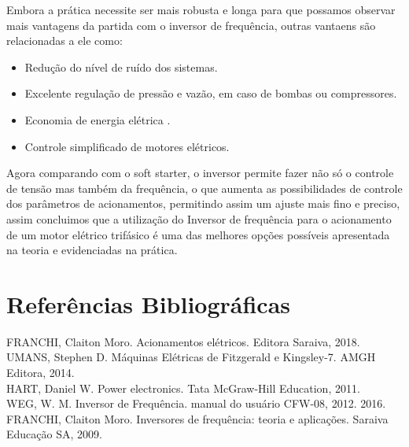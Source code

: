 \documentclass[a4paper, 12pt,oneside, english, brazil]{abntex2}
\begin{document}
Embora a prática necessite ser mais robusta e longa para que possamos observar mais vantagens da partida com o inversor de frequência, outras vantaens são relacionadas a ele como:
\begin{itemize}
    \item Redução do nível de ruído dos sistemas.
    \item Excelente regulação de pressão e vazão, em caso de bombas ou compressores.
    \item Economia de energia elétrica .
    \item Controle simplificado de motores elétricos.
    \end{itemize}
    
Agora comparando com o soft starter, o inversor permite fazer não só o controle de tensão mas também da frequência, o que aumenta as possibilidades de controle dos parâmetros de acionamentos, permitindo assim um ajuste mais fino e preciso, assim concluimos que a utilização do Inversor de frequência para o acionamento de um motor elétrico trifásico é uma das melhores opções possíveis apresentada na teoria e evidenciadas na prática.

\chapter{Referências Bibliográficas}
\footnotesize{

\noindent FRANCHI, Claiton Moro. Acionamentos elétricos. Editora Saraiva, 2018.\\

\noindent UMANS, Stephen D. Máquinas Elétricas de Fitzgerald e Kingsley-7. AMGH Editora, 2014.\\

\noindent HART, Daniel W. Power electronics. Tata McGraw-Hill Education, 2011.\\

\noindent WEG, W. M. Inversor de Frequência. manual do usuário CFW-08, 2012. 2016.\\

\noindent FRANCHI, Claiton Moro. Inversores de frequência: teoria e aplicações. Saraiva Educação SA, 2009.\\

}
\end{document}
